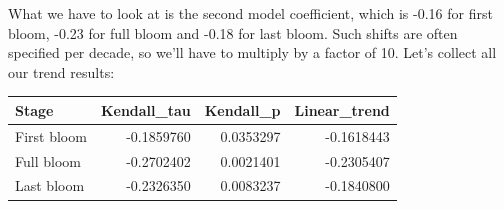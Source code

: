 \documentclass[
]{book}
\newenvironment{Shaded}{\begin{snugshade}}{\end{snugshade}}
\newcommand{\DataTypeTok}[1]{\textcolor[rgb]{0.13,0.29,0.53}{#1}}
\newcommand{\DecValTok}[1]{\textcolor[rgb]{0.00,0.00,0.81}{#1}}
\newcommand{\KeywordTok}[1]{\textcolor[rgb]{0.13,0.29,0.53}{\textbf{#1}}}
\newcommand{\NormalTok}[1]{#1}
\newcommand{\OperatorTok}[1]{\textcolor[rgb]{0.81,0.36,0.00}{\textbf{#1}}}
\newcommand{\StringTok}[1]{\textcolor[rgb]{0.31,0.60,0.02}{#1}}
\begin{document}
What we have to look at is the second model coefficient, which is -0.16 for first bloom, -0.23 for full bloom and -0.18 for last bloom. Such shifts are often specified per decade, so we'll have to multiply by a factor of 10. Let's collect all our trend results:

\begin{Shaded}
\end{Shaded}

\begingroup\fontsize{10}{12}\selectfont

\begin{tabular}{l|r|r|r}
\hline
Stage & Kendall\_tau & Kendall\_p & Linear\_trend\\
\hline
First bloom & -0.1859760 & 0.0353297 & -0.1618443\\
\hline
Full bloom & -0.2702402 & 0.0021401 & -0.2305407\\
\hline
Last bloom & -0.2326350 & 0.0083237 & -0.1840800\\
\hline
\end{tabular}
\endgroup{}
\end{document}
